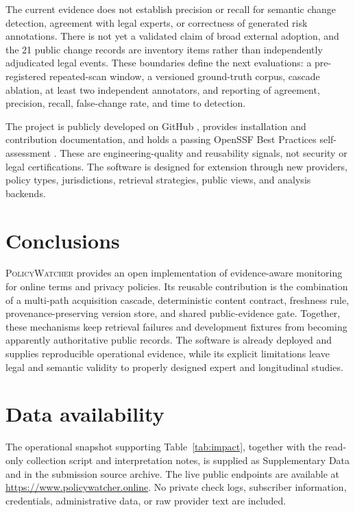 \documentclass[preprint,12pt,a4paper]{elsarticle}
\newcommand{\pw}{\textsc{PolicyWatcher}}
\begin{document}
The current evidence does not establish precision or recall for semantic change
detection, agreement with legal experts, or correctness of generated risk
annotations. There is not yet a validated claim of broad external adoption, and
the 21 public change records are inventory items rather than independently
adjudicated legal events. These boundaries define the next evaluations: a
pre-registered repeated-scan window, a versioned ground-truth corpus, cascade
ablation, at least two independent annotators, and reporting of agreement,
precision, recall, false-change rate, and time to detection.

The project is publicly developed on GitHub \cite{policywatcher}, provides
installation and contribution documentation, and holds a passing OpenSSF Best
Practices self-assessment \cite{openssf}. These are engineering-quality and
reusability signals, not security or legal certifications. The software is
designed for extension through new providers, policy types, jurisdictions,
retrieval strategies, public views, and analysis backends.

\section{Conclusions}
\label{sec:conclusions}

\pw{} provides an open implementation of evidence-aware monitoring for online
terms and privacy policies. Its reusable contribution is the combination of a
multi-path acquisition cascade, deterministic content contract, freshness rule,
provenance-preserving version store, and shared public-evidence gate. Together,
these mechanisms keep retrieval failures and development fixtures from becoming
apparently authoritative public records. The software is already deployed and
supplies reproducible operational evidence, while its explicit limitations leave
legal and semantic validity to properly designed expert and longitudinal studies.

\section*{Data availability}

The operational snapshot supporting Table~\ref{tab:impact}, together with the
read-only collection script and interpretation notes, is supplied as
Supplementary Data and in the submission source archive. The live public
endpoints are available at \url{https://www.policywatcher.online}. No private
check logs, subscriber information, credentials, administrative data, or raw
provider text are included.
\end{document}
